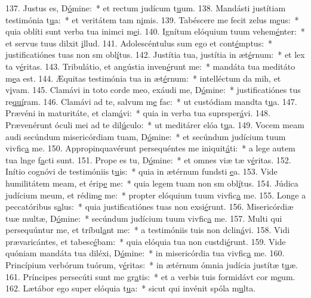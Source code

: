 137. Justus es, D\uline{ó}mine:~* et rectum judícum t\uline{u}um.
138. Mandásti justítiam testimónia t\uline{u}a:~* et veritátem tam n\uline{i}mis.
139. Tabéscere me fecit zelus m\uline{e}us:~* quia oblíti sunt verba tua inimci m\uline{e}i.
140. Ignítum elóquium tuum vehem\uline{é}nter:~* et servus tuus dilxit \uline{i}llud.
141. Adolescéntulus sum ego et cont\uline{é}mptus:~* justificatiónes tuas non sm obl\uline{í}tus.
142. Justítia tua, justítia in æt\uline{é}rnum:~* et lex ta v\uline{é}ritas.
143. Tribulátio, et angústia inven\uline{é}runt me:~* mandáta tua meditáto m\uline{e}a est.
144. Æquitas testimónia tua in æt\uline{é}rnum:~* intelléctum da mih, et v\uline{i}vam.
145. Clamávi in toto corde meo, exáudi me, D\uline{ó}mine:~* justificatiónes tus re\uline{quí}ram.
146. Clamávi ad te, salvum m\uline{e} fac:~* ut custódiam mandta t\uline{u}a.
147. Prævéni in maturitáte, et clam\uline{á}vi:~* quia in verba tua suprsper\uline{á}vi.
148. Prævenérunt óculi mei ad te dil\uline{ú}culo:~* ut meditárer elóa t\uline{u}a.
149. Vocem meam audi secúndum misericórdiam tuam, D\uline{ó}mine:~* et secúndum judícium tuum vivfic\uline{a} me.
150. Appropinquavérunt persequéntes me iniquit\uline{á}ti:~* a lege autem tua lnge f\uline{a}cti sunt.
151. Prope es tu, D\uline{ó}mine:~* et omnes viæ tæ v\uline{é}ritas.
152. Inítio cognóvi de testimóniis t\uline{u}is:~* quia in ætérnum fundsti \uline{e}a.
153. Vide humilitátem meam, et érip\uline{e} me:~* quia legem tuam non sm obl\uline{í}tus.
154. Júdica judícium meum, et rédim\uline{e} me:~* propter elóquium tuum vivfic\uline{a} me.
155. Longe a peccatóribus s\uline{a}lus:~* quia justificatiónes tuas non exsi\uline{é}runt.
156. Misericórdiæ tuæ multæ, D\uline{ó}mine:~* secúndum judícium tuum vivfic\uline{a} me.
157. Multi qui persequúntur me, et tríbul\uline{a}nt me:~* a testimóniis tuis non dclin\uline{á}vi.
158. Vidi prævaricántes, et tabesc\uline{é}bam:~* quia elóquia tua non custdi\uline{é}runt.
159. Vide quóniam mandáta tua diléxi, D\uline{ó}mine:~* in misericórdia tua vivfic\uline{a} me.
160. Princípium verbórum tuórum, v\uline{é}ritas:~* in ætérnum ómnia judícia justítæ t\uline{u}æ.
161. Príncipes persecúti sunt me gr\uline{a}tis:~* et a verbis tuis formidávt cor m\uline{e}um.
162. Lætábor ego super elóquia t\uline{u}a:~* sicut qui invénit spóla m\uline{u}lta.
